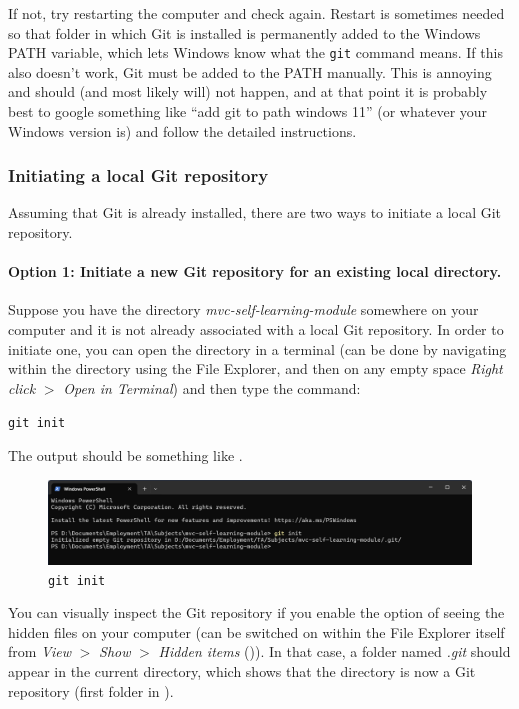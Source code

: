 \documentclass[a4paper,10pt]{article}
\begin{document}
If not, try restarting the computer and check again. Restart is sometimes needed so that folder in which Git is installed is permanently added to the Windows PATH variable, which lets Windows know what the \texttt{git} command means. If this also doesn't work, Git must be added to the PATH manually. This is annoying and should (and most likely will) not happen, and at that point it is probably best to google something like ``add git to path windows 11'' (or whatever your Windows version is) and follow the detailed instructions.

\subsubsection{Initiating a local Git repository}
\label{sec:git_init}

Assuming that Git is already installed, there are two ways to initiate a local Git repository.

\paragraph{Option 1: Initiate a new Git repository for an existing local directory.} Suppose you have the directory \emph{mvc-self-learning-module} somewhere on your computer and it is not already associated with a local Git repository. In order to initiate one, you can open the directory in a terminal (can be done by navigating within the directory using the File Explorer, and then on any empty space \emph{Right click} $>$ \emph{Open in Terminal}) and then type the command: 

\texttt{git init}

The output should be something like .

\begin{figure}[htbp]
    \centering
    \includegraphics[width=\textwidth]{git_init.png}
    \caption{\texttt{git init}}
    \label{fig:git_init}   
\end{figure}


You can visually inspect the Git repository if you enable the option of seeing the hidden files on your computer (can be switched on within the File Explorer itself from \emph{View} $>$ \emph{Show} $>$ \emph{Hidden items} ()). In that case, a folder named \emph{.git} should appear in the current directory, which shows that the directory is now a Git repository (first folder in ). 
\end{document}

